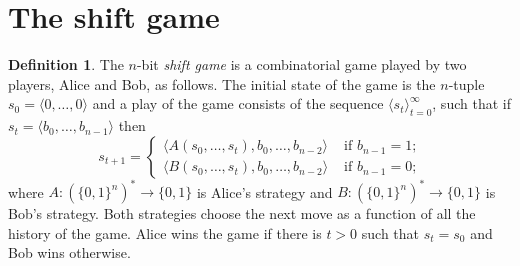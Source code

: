 \documentclass[final,12pt]{elsarticle}
\theoremstyle{definition} \newtheorem{definition}[theorem]{Definition} \newtheorem{observation}[theorem]{Observation} \newtheorem{example}[theorem]{Example} \newtheorem{remark}[theorem]{Remark} \newtheorem{corrolary}[theorem]{Corrolary}
\newcommand{\T}[1]{\langle{#1}\rangle}
\begin{document}
\section{The shift game}
\label{sec:game}

\begin{definition}
	\label{Def:shift game} The $n$-bit
	\emph{shift game} is a combinatorial game played by two players, Alice and Bob, as follows. The initial state of the game is the $n$-tuple $s_0=\T{0,\dots,0}$ and a play of the game consists of the sequence $\T{s_t }_{t=0}^\infty$, such that if $s_t=\T{b_0, \dots, b_{n-1}}$ then 
		$$s_{t+1} =
		\begin{cases}
			\T{ A(s_0,\dots,s_t), b_0, \dots, b_{n-2}} &
			\text{ if $b_{n-1} = 1$;}      \\
			\T{ B(s_0,\dots,s_t), b_0, \dots, b_{n-2}} &
			\text{ if $b_{n-1} = 0$;}
		\end{cases}$$ where $A \colon(\{0,1\}^n)^* \to \{0,1\}$ is Alice's strategy and $B\colon (\{0,1\}^n)^* \to \{0,1\}$ is Bob's strategy. Both strategies choose the next move as a function of all the history of the game. Alice wins the game if there is $t>0$ such that $s_t=s_0$ and Bob wins otherwise.
\end{definition}
\end{document}
